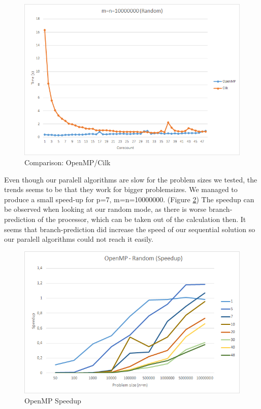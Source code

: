 \documentclass[12pt,a4paper,titlepage,oneside]{scrartcl}
\begin{document}
\begin{figure}[h]
\includegraphics[width=\linewidth]{Saturn_Random_10000000}
\caption{Comparison: OpenMP/Cilk}
\label{fig:comparison_cilk_omp_random_10000000}
\end{figure}

Even though our paralell algorithms are slow for the problem sizes we tested, the trends seems to be that they work for bigger problemsizes. We managed to produce a small speed-up for p=7, m=n=10000000. (Figure \ref{fig:saturn_omp_speedup_random}) The speedup can be observed when looking at our random mode, as there is worse branch-prediction of the processor, which can be taken out of the calculation then. It seems that branch-prediction did increase the speed of our sequential solution so our paralell algorithms could not reach it easily.

\begin{figure}[h]
\includegraphics[width=\linewidth]{Saturn_OpenMP_Speedup_Random}
\caption{OpenMP Speedup}
\label{fig:saturn_omp_speedup_random}
\end{figure}
\end{document}
